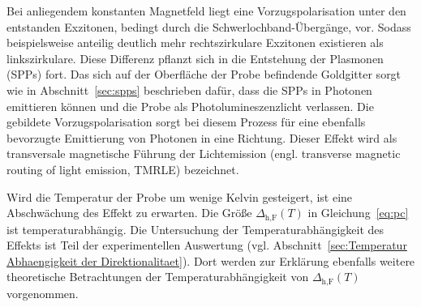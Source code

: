 Bei anliegendem konstanten Magnetfeld liegt eine Vorzugspolarisation unter 
den entstanden Exzitonen, bedingt durch die Schwerlochband-Übergänge, vor.
Sodass beispielsweise anteilig deutlich mehr rechtszirkulare Exzitonen existieren
als linkszirkulare. 
Diese Differenz pflanzt sich in die Entstehung der Plasmonen (SPPs) fort.
Das sich auf der Oberfläche der Probe befindende Goldgitter sorgt wie in Abschnitt~\ref{sec:spps}
beschrieben dafür, dass die SPPs in Photonen emittieren können und die Probe als Photolumineszenzlicht verlassen.
Die gebildete Vorzugspolarisation sorgt bei diesem Prozess für eine ebenfalls bevorzugte Emittierung von Photonen
in eine Richtung. 
Dieser Effekt wird als transversale magnetische Führung der Lichtemission 
(engl. transverse magnetic routing of light emission, TMRLE) bezeichnet.

Wird die Temperatur der Probe um wenige Kelvin gesteigert, ist eine Abschwächung des Effekt zu erwarten.
Die Größe $\Delta_\text{h,F}(T)$ in Gleichung~\ref{eq:pc} ist temperaturabhängig. 
Die Untersuchung der Temperaturabhängigkeit des Effekts ist Teil der experimentellen 
Auswertung (vgl. Abschnitt~\ref{sec:Temperatur Abhaengigkeit der Direktionalitaet}). 
Dort werden zur Erklärung ebenfalls weitere theoretische Betrachtungen der Temperaturabhängigkeit 
von $\Delta_\text{h,F}(T)$ vorgenommen.